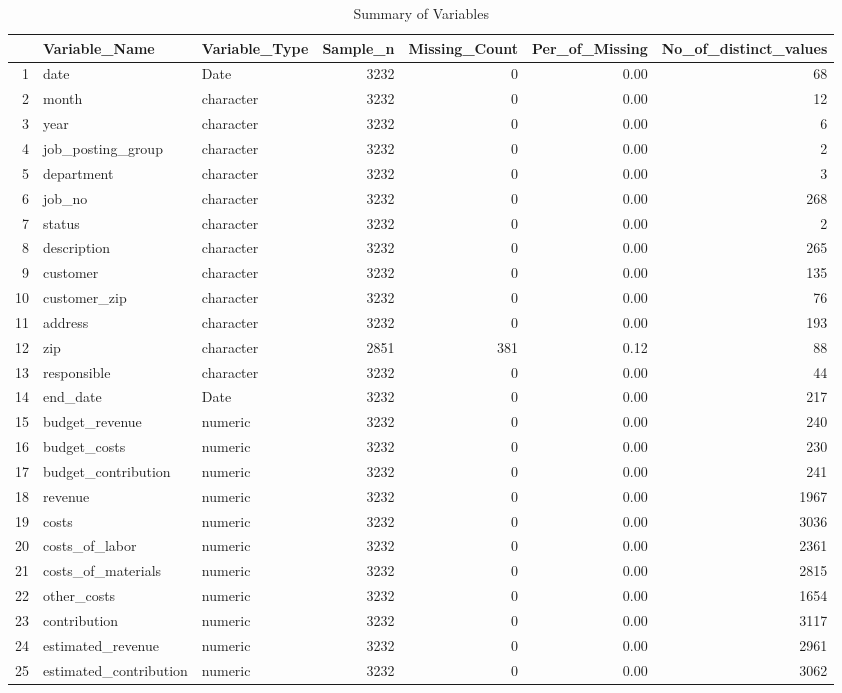 \begin{sidewaystable}[ht]
\centering
\caption{Summary of Variables} 
\begin{tabular}{rllrrrr}
  \hline
 & Variable\_Name & Variable\_Type & Sample\_n & Missing\_Count & Per\_of\_Missing & No\_of\_distinct\_values \\ 
  \hline
1 & date & Date & 3232 &   0 & 0.00 &  68 \\ 
  2 & month & character & 3232 &   0 & 0.00 &  12 \\ 
  3 & year & character & 3232 &   0 & 0.00 &   6 \\ 
  4 & job\_posting\_group & character & 3232 &   0 & 0.00 &   2 \\ 
  5 & department & character & 3232 &   0 & 0.00 &   3 \\ 
  6 & job\_no & character & 3232 &   0 & 0.00 & 268 \\ 
  7 & status & character & 3232 &   0 & 0.00 &   2 \\ 
  8 & description & character & 3232 &   0 & 0.00 & 265 \\ 
  9 & customer & character & 3232 &   0 & 0.00 & 135 \\ 
  10 & customer\_zip & character & 3232 &   0 & 0.00 &  76 \\ 
  11 & address & character & 3232 &   0 & 0.00 & 193 \\ 
  12 & zip & character & 2851 & 381 & 0.12 &  88 \\ 
  13 & responsible & character & 3232 &   0 & 0.00 &  44 \\ 
  14 & end\_date & Date & 3232 &   0 & 0.00 & 217 \\ 
  15 & budget\_revenue & numeric & 3232 &   0 & 0.00 & 240 \\ 
  16 & budget\_costs & numeric & 3232 &   0 & 0.00 & 230 \\ 
  17 & budget\_contribution & numeric & 3232 &   0 & 0.00 & 241 \\ 
  18 & revenue & numeric & 3232 &   0 & 0.00 & 1967 \\ 
  19 & costs & numeric & 3232 &   0 & 0.00 & 3036 \\ 
  20 & costs\_of\_labor & numeric & 3232 &   0 & 0.00 & 2361 \\ 
  21 & costs\_of\_materials & numeric & 3232 &   0 & 0.00 & 2815 \\ 
  22 & other\_costs & numeric & 3232 &   0 & 0.00 & 1654 \\ 
  23 & contribution & numeric & 3232 &   0 & 0.00 & 3117 \\ 
  24 & estimated\_revenue & numeric & 3232 &   0 & 0.00 & 2961 \\ 
  25 & estimated\_contribution & numeric & 3232 &   0 & 0.00 & 3062 \\ 
   \hline
\end{tabular}
\end{sidewaystable}
